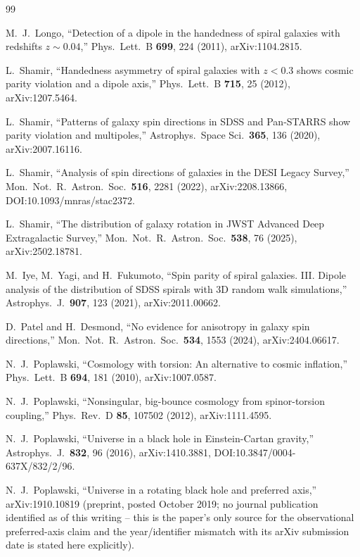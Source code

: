 \documentclass[twocolumn,linenumbers]{aastex702}
\begin{document}
\begin{thebibliography}{99}

M.~J.~Longo,
``Detection of a dipole in the handedness of spiral galaxies with redshifts $z\!\sim\!0.04$,''
Phys.\ Lett.\ B \textbf{699}, 224 (2011), arXiv:1104.2815.

L.~Shamir,
``Handedness asymmetry of spiral galaxies with $z\!<\!0.3$ shows cosmic parity violation and a dipole axis,''
Phys.\ Lett.\ B \textbf{715}, 25 (2012), arXiv:1207.5464.

L.~Shamir,
``Patterns of galaxy spin directions in SDSS and Pan-STARRS show parity violation and multipoles,''
Astrophys.\ Space Sci.\ \textbf{365}, 136 (2020), arXiv:2007.16116.

L.~Shamir,
``Analysis of spin directions of galaxies in the DESI Legacy Survey,''
Mon.\ Not.\ R.\ Astron.\ Soc.\ \textbf{516}, 2281 (2022), arXiv:2208.13866,
DOI:10.1093/mnras/stac2372.

L.~Shamir,
``The distribution of galaxy rotation in JWST Advanced Deep Extragalactic Survey,''
Mon.\ Not.\ R.\ Astron.\ Soc.\ \textbf{538}, 76 (2025), arXiv:2502.18781.

M.~Iye, M.~Yagi, and H.~Fukumoto,
``Spin parity of spiral galaxies. III. Dipole analysis of the distribution of SDSS spirals with 3D random walk simulations,''
Astrophys.\ J.\ \textbf{907}, 123 (2021), arXiv:2011.00662.

D.~Patel and H.~Desmond,
``No evidence for anisotropy in galaxy spin directions,''
Mon.\ Not.\ R.\ Astron.\ Soc.\ \textbf{534}, 1553 (2024), arXiv:2404.06617.

N.~J.~Poplawski,
``Cosmology with torsion: An alternative to cosmic inflation,''
Phys.\ Lett.\ B \textbf{694}, 181 (2010), arXiv:1007.0587.

N.~J.~Poplawski,
``Nonsingular, big-bounce cosmology from spinor-torsion coupling,''
Phys.\ Rev.\ D \textbf{85}, 107502 (2012), arXiv:1111.4595.

N.~J.~Poplawski,
``Universe in a black hole in Einstein-Cartan gravity,''
Astrophys.\ J.\ \textbf{832}, 96 (2016), arXiv:1410.3881,
DOI:10.3847/0004-637X/832/2/96.

N.~J.~Poplawski,
``Universe in a rotating black hole and preferred axis,''
arXiv:1910.10819 (preprint, posted October 2019; no journal publication
identified as of this writing -- this is the paper's only source for the
observational preferred-axis claim and the year/identifier mismatch with
its arXiv submission date is stated here explicitly).


\end{thebibliography}
\end{document}
